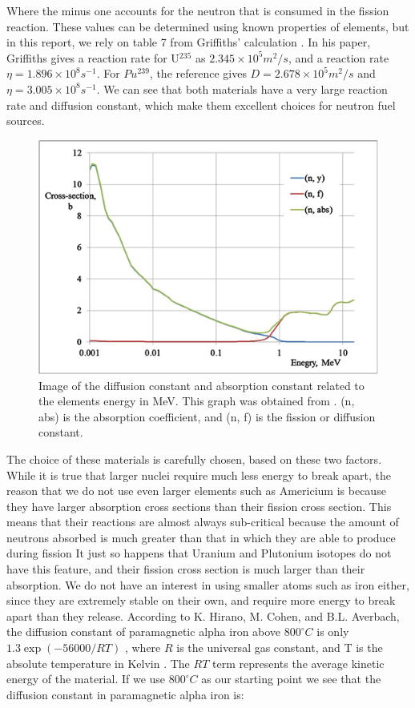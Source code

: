 \documentclass[letterpaper, 12pt]{article}
\begin{document}
         Where the minus one accounts for the neutron that is consumed in the fission reaction. These values can be determined using known properties of elements, but in this report, we rely on table 7 from Griffiths' calculation \cite{Griffiths_2020}. In his paper, Griffiths gives a reaction rate for U$^{235}$ as $2.345 \times 10^5 m^2/s$, and a reaction rate $\eta = 1.896 \times 10^{8} s^{-1}$. For $Pu^{239}$, the reference gives $D = 2.678 \times 10^{5} m^2/s$ and $\eta = 3.005 \times 10^8 s^{-1}$. We can see that both materials have a very large reaction rate and diffusion constant, which make them excellent choices for neutron fuel sources.\\

         \begin{figure}
            \centering
            \includegraphics[width=0.5\linewidth]{Graphs/Americium-Graph.png}
            \caption{Image of the diffusion constant and absorption constant related to the elements energy in MeV. This graph was obtained from \cite{article}. (n, abs) is the absorption coefficient, and (n, f) is the fission or diffusion constant.}
            \label{Americium}
         \end{figure}

         The choice of these materials is carefully chosen, based on these two factors. While it is true that larger nuclei require much less energy to break apart, the reason that we do not use even larger elements such as Americium is because they have larger absorption cross sections than their fission cross section. This means that their reactions are almost always sub-critical because the amount of neutrons absorbed is much greater than that in which they are able to produce during fission \cite{article} It just so happens that Uranium and Plutonium isotopes do not have this feature, and their fission cross section is much larger than their absorption. We do not have an interest in using smaller atoms such as iron either, since they are extremely stable on their own, and require more energy to break apart than they release. According to K. Hirano, M. Cohen, and B.L. Averbach, the diffusion constant of paramagnetic alpha iron above $800^\circ C$ is only $1.3 \exp(-56000 / RT)$ \cite{Hirano_Cohen_Averbach_1961}, where $R$ is the universal gas constant, and T is the absolute temperature in Kelvin \cite{6.2.3.1_2013}. The $RT$ term represents the average kinetic energy of the material. If we use $800^\circ C$ as our starting point we see that the diffusion constant in paramagnetic alpha iron is:
\end{document}
